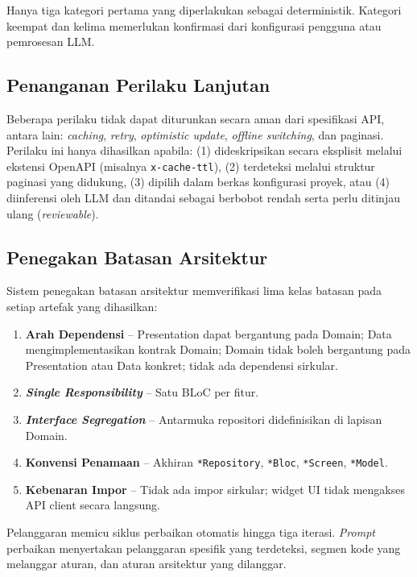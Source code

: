 Hanya tiga kategori pertama yang diperlakukan sebagai deterministik. Kategori keempat dan kelima memerlukan konfirmasi dari konfigurasi pengguna atau pemrosesan LLM.

\subsection{Penanganan Perilaku Lanjutan}

Beberapa perilaku tidak dapat diturunkan secara aman dari spesifikasi API, antara lain: \textit{caching}, \textit{retry}, \textit{optimistic update}, \textit{offline switching}, dan paginasi. Perilaku ini hanya dihasilkan apabila: (1) dideskripsikan secara eksplisit melalui ekstensi OpenAPI (misalnya \texttt{x-cache-ttl}), (2) terdeteksi melalui struktur paginasi yang didukung, (3) dipilih dalam berkas konfigurasi proyek, atau (4) diinferensi oleh LLM dan ditandai sebagai berbobot rendah serta perlu ditinjau ulang (\textit{reviewable}).

\subsection{Penegakan Batasan Arsitektur}

Sistem penegakan batasan arsitektur memverifikasi lima kelas batasan pada setiap artefak yang dihasilkan:

\begin{enumerate}
    \item \textbf{Arah Dependensi} -- Presentation dapat bergantung pada Domain; Data mengimplementasikan kontrak Domain; Domain tidak boleh bergantung pada Presentation atau Data konkret; tidak ada dependensi sirkular.
    \item \textbf{\textit{Single Responsibility}} -- Satu BLoC per fitur.
    \item \textbf{\textit{Interface Segregation}} -- Antarmuka repositori didefinisikan di lapisan Domain.
    \item \textbf{Konvensi Penamaan} -- Akhiran \texttt{*Repository}, \texttt{*Bloc}, \texttt{*Screen}, \texttt{*Model}.
    \item \textbf{Kebenaran Impor} -- Tidak ada impor sirkular; widget UI tidak mengakses API client secara langsung.
\end{enumerate}

Pelanggaran memicu siklus perbaikan otomatis hingga tiga iterasi. \textit{Prompt} perbaikan menyertakan pelanggaran spesifik yang terdeteksi, segmen kode yang melanggar aturan, dan aturan arsitektur yang dilanggar.

